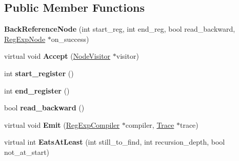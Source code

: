 \subsection*{Public Member Functions}
\begin{DoxyCompactItemize}
\item 
{\bfseries Back\+Reference\+Node} (int start\+\_\+reg, int end\+\_\+reg, bool read\+\_\+backward, \hyperlink{classv8_1_1internal_1_1_reg_exp_node}{Reg\+Exp\+Node} $\ast$on\+\_\+success)\hypertarget{classv8_1_1internal_1_1_back_reference_node_af3d1f36e2b901f1278af7c5ffd9af3db}{}\label{classv8_1_1internal_1_1_back_reference_node_af3d1f36e2b901f1278af7c5ffd9af3db}

\item 
virtual void {\bfseries Accept} (\hyperlink{classv8_1_1internal_1_1_node_visitor}{Node\+Visitor} $\ast$visitor)\hypertarget{classv8_1_1internal_1_1_back_reference_node_af0f0870c3f4113d8ad375a7c9436ddff}{}\label{classv8_1_1internal_1_1_back_reference_node_af0f0870c3f4113d8ad375a7c9436ddff}

\item 
int {\bfseries start\+\_\+register} ()\hypertarget{classv8_1_1internal_1_1_back_reference_node_a5898f97fe856e743638d8a4db8aae160}{}\label{classv8_1_1internal_1_1_back_reference_node_a5898f97fe856e743638d8a4db8aae160}

\item 
int {\bfseries end\+\_\+register} ()\hypertarget{classv8_1_1internal_1_1_back_reference_node_a9cc793e4e2defe8937482aa8d3462047}{}\label{classv8_1_1internal_1_1_back_reference_node_a9cc793e4e2defe8937482aa8d3462047}

\item 
bool {\bfseries read\+\_\+backward} ()\hypertarget{classv8_1_1internal_1_1_back_reference_node_a9f4bbaa6fe3c5ccd09d61aa0528b2b9b}{}\label{classv8_1_1internal_1_1_back_reference_node_a9f4bbaa6fe3c5ccd09d61aa0528b2b9b}

\item 
virtual void {\bfseries Emit} (\hyperlink{classv8_1_1internal_1_1_reg_exp_compiler}{Reg\+Exp\+Compiler} $\ast$compiler, \hyperlink{classv8_1_1internal_1_1_trace}{Trace} $\ast$trace)\hypertarget{classv8_1_1internal_1_1_back_reference_node_a3d835aa391ea61ddde7ac75ba0ee9536}{}\label{classv8_1_1internal_1_1_back_reference_node_a3d835aa391ea61ddde7ac75ba0ee9536}

\item 
virtual int {\bfseries Eats\+At\+Least} (int still\+\_\+to\+\_\+find, int recursion\+\_\+depth, bool not\+\_\+at\+\_\+start)\hypertarget{classv8_1_1internal_1_1_back_reference_node_ae4b888f1d81c4a136c4b2a17e3bb6c62}{}\label{classv8_1_1internal_1_1_back_reference_node_ae4b888f1d81c4a136c4b2a17e3bb6c62}


\end{DoxyCompactItemize}
